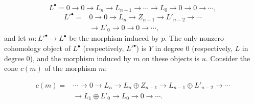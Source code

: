 \[
L^\bullet=0\longrightarrow0\longrightarrow L_n\longrightarrow L_{n-1}
\longrightarrow\cdots\longrightarrow L_0\longrightarrow0
\longrightarrow0\longrightarrow\cdots ,
\]
\[
\begin{aligned}
{L'}^\bullet={}&0\longrightarrow0\longrightarrow L_n
\longrightarrow Z_{n-1}\longrightarrow L'_{n-2}
\longrightarrow\cdots\\
&\longrightarrow L'_0\longrightarrow0\longrightarrow0
\longrightarrow\cdots ,
\end{aligned}
\]
and let $m\colon {L'}^\bullet\longrightarrow L^\bullet$ be the morphism
induced by $p$. The only nonzero cohomology object of $L^\bullet$
(respectively, ${L'}^\bullet$) is $Y$ in degree $0$ (respectively, $L$ in
degree $0$), and the morphism induced by $m$ on these objects is $u$.
Consider the cone $c(m)$ of the morphism $m$:

\[
\begin{aligned}
c(m)={}&\cdots\longrightarrow0\longrightarrow L_n
\longrightarrow L_n\oplus Z_{n-1}
\longrightarrow L_{n-1}\oplus L'_{n-2}\longrightarrow\cdots\\
&\longrightarrow L_1\oplus L'_0\longrightarrow L_0
\longrightarrow0\longrightarrow\cdots.
\end{aligned}
\]
\endgroup
